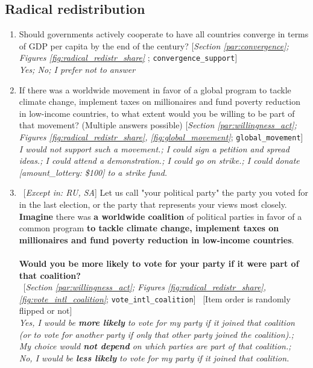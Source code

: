  \subsection*{Radical redistribution} 
 \begin{enumerate}[resume] 
\item  \label{q:convergence_support} Should governments actively cooperate to have all countries converge in terms of GDP per capita by the end of the century? [\textit{Section \ref{par:convergence}; Figures \ref{fig:radical_redistr_share}%
}; 
\verb|convergence_support|]
  \\ \textit{Yes; No; I prefer not to answer}

\item  \label{q:global_movement} If there was a worldwide movement in favor of a global program to tackle climate change, implement taxes on millionaires and fund poverty reduction in low-income countries, to what extent would you be willing to be part of that movement? (Multiple answers possible) [\textit{Section \ref{par:willingness_act}; Figures \ref{fig:radical_redistr_share}, \ref{fig:global_movement}}; 
\verb|global_movement|]
  \\ \textit{I would \textit{not} support such a movement.; I could sign a petition and spread ideas.; I could attend a demonstration.; I could go on strike.; I could donate [amount\_lottery: \$100] to a strike fund.}

\item ~[\textit{Except in: RU, SA}] \label{q:vote_intl_coalition} Let us call "your political party" the party you voted for in the last election, or the party that represents your views most closely.~\\\textbf{Imagine }there was \textbf{a worldwide coalition} of political parties in favor of a common program \textbf{to tackle climate change, implement taxes on millionaires and fund poverty reduction in low-income countries}.~\\\\\textbf{Would you be more likely 
to vote for your party if it were part of that coalition?}\\ 
~[\textit{Section \ref{par:willingness_act}; Figures \ref{fig:radical_redistr_share}, \ref{fig:vote_intl_coalition}}; 
\verb|vote_intl_coalition|]
~[Item order is randomly flipped or not]
  \\ \textit{Yes, I would be \textbf{more likely} to vote for my party if it joined that coalition (or to vote for another party if only that other party joined the coalition).; \\My choice would \textbf{not depend} on which parties are part of that coalition.; \\No, I would be \textbf{less likely} to vote for my party if it joined that coalition.}


\end{enumerate}
